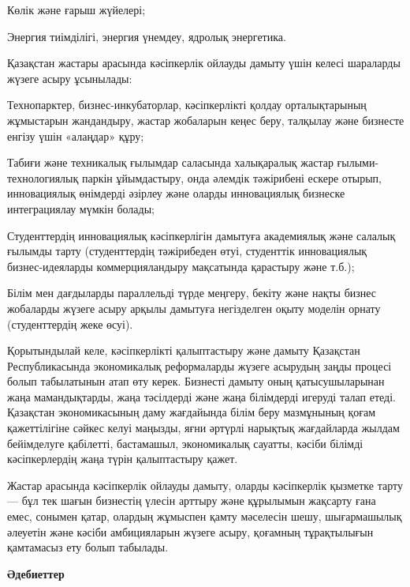 Көлік және ғарыш жүйелері;

Энергия тиімділігі, энергия үнемдеу, ядролық энергетика.

Қазақстан жастары арасында кәсіпкерлік ойлауды дамыту үшін келесі
шараларды жүзеге асыру ұсынылады:

Технопарктер, бизнес-инкубаторлар, кәсіпкерлікті қолдау орталықтарының
жұмыстарын жандандыру, жастар жобаларын кеңес беру, талқылау және
бизнесте енгізу үшін «алаңдар» құру;

Табиғи және техникалық ғылымдар саласында халықаралық жастар
ғылыми-технологиялық паркін ұйымдастыру, онда әлемдік тәжірибені ескере
отырып, инновациялық өнімдерді әзірлеу және оларды инновациялық бизнеске
интеграциялау мүмкін болады;

Студенттердің инновациялық кәсіпкерлігін дамытуға академиялық және
салалық ғылымды тарту (студенттердің тәжірибеден өтуі, студенттік
инновациялық бизнес-идеяларды коммерцияландыру мақсатында қарастыру және
т.б.);

Білім мен дағдыларды параллельді түрде меңгеру, бекіту және нақты бизнес
жобаларды жүзеге асыру арқылы дамытуға негізделген оқыту моделін орнату
(студенттердің жеке өсуі).

Қорытындылай келе, кәсіпкерлікті қалыптастыру және дамыту Қазақстан
Республикасында экономикалық реформаларды жүзеге асырудың заңды процесі
болып табылатынын атап өту керек. Бизнесті дамыту оның қатысушыларынан
жаңа мамандықтарды, жаңа тәсілдерді және жаңа білімдерді игеруді талап
етеді. Қазақстан экономикасының даму жағдайында білім беру мазмұнының
қоғам қажеттілігіне сәйкес келуі маңызды, яғни әртүрлі нарықтық
жағдайларда жылдам бейімделуге қабілетті, бастамашыл, экономикалық
сауатты, кәсіби білімді кәсіпкерлердің жаңа түрін қалыптастыру қажет.

Жастар арасында кәсіпкерлік ойлауды дамыту, оларды кәсіпкерлік қызметке
тарту --- бұл тек шағын бизнестің үлесін арттыру және құрылымын жақсарту
ғана емес, сонымен қатар, олардың жұмыспен қамту мәселесін шешу,
шығармашылық әлеуетін және кәсіби амбицияларын жүзеге асыру, қоғамның
тұрақтылығын қамтамасыз ету болып табылады.

{\bfseries Әдебиеттер}


